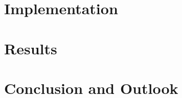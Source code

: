 \documentclass[twoside,english]{uiofysmaster}
\begin{document}
\part{Implementation}
\label{prt:implementation}




\part{Results}
\label{prt:results}


\part{Conclusion and Outlook}
\label{prt:conclusion}


\printbibliography[heading=bibintoc, title={References}]
\end{document}
